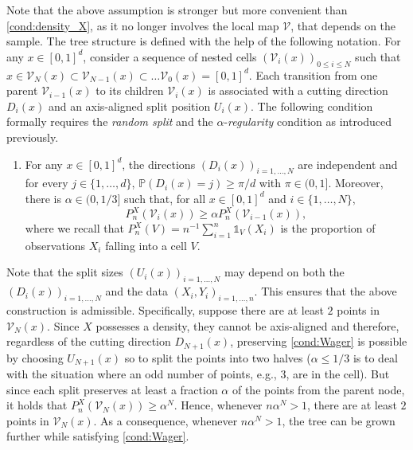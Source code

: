 \documentclass[paper=a4, fontsize=11pt]{scrartcl}
\newcommand{\ind}{\mathds{1}}
\begin{document}
Note that the above assumption is stronger but more convenient than \ref{cond:density_X}, as it no longer involves the local map $\mathcal V$, that depends on the sample.  The tree structure is defined with the help of the following notation. For any $x \in [0,1]^d$, consider a sequence of nested cells $(\mathcal{V}_i(x))_{0 \leq i \leq N}$ such that $x \in \mathcal{V}_N(x)\subset \mathcal{V}_{N-1}(x)\subset \dots \mathcal{V}_{0}(x) = [0,1]^d$. Each transition from one parent $\mathcal{V}_{i-1} (x)$ to its children $\mathcal{V}_{i}(x)$ is associated with a cutting direction $D_i(x)$ and an axis-aligned split position $U_i(x)$.
The following condition formally requires the \textit{random split} and the $\alpha$-\textit{regularity} condition as introduced previously. 
\begin{enumerate}[label=(W), wide=0.5em,  leftmargin=*]
\item \label{cond:Wager} For any $x\in [0,1]^d$, the directions $(D_i(x))_{i=1,\dots,N}$ are independent and for every $j \in \{1, \dots, d\}$, $\mathbb{P}(D_i(x)=j) \geq \pi/d$ with $\pi\in (0 ,  1]$. Moreover, there is $\alpha \in (0,1/3]$ such that, for all $x\in [0,1]^d$ and $i \in \{1,\ldots, N\}, $%
 $$  P _n^X(\mathcal{V}_{i}(x) )  \geq \alpha P _n^X(\mathcal{V}_{i-1}(x) ) ,$$
where we recall that $P_n^X(V) = n^{-1} \sum_{i=1} ^n \ind _V(X_i)$ is the proportion of observations $X_i$ falling into a cell $V$. 
\end{enumerate}



Note that the split sizes $(U_i(x))_{i=1,\dots,N}$ may depend on both the $(D_i(x))_{i=1,\dots,N}$ and the data $(X_i,Y_i)_{i=1,\dots,n}$. This ensures that the above construction is admissible. Specifically, suppose there are at least $2$ points in  $\mathcal{V}_N(x) $. %
Since $X$ possesses a density, they cannot be axis-aligned and therefore, regardless of the cutting direction $ D_{N+1}(x)$, preserving \ref{cond:Wager} is possible by choosing $U_{N+1}(x)$ so to split the points into two halves ($\alpha \leq 1/3$ is to deal with the situation where an odd number of points, e.g., $3$, are in the cell). But since each split preserves at least a fraction $\alpha$ of the points from the parent node, it holds that $P_n^X(\mathcal{V}_N(x)) \geq \alpha^N$. %
Hence, whenever $n \alpha^{N}>1 $, there are at least $2$ points in  $\mathcal{V}_N(x) $. As a consequence, whenever $n\alpha ^N>1$, the tree can be grown further while satisfying \ref{cond:Wager}.
\end{document}
